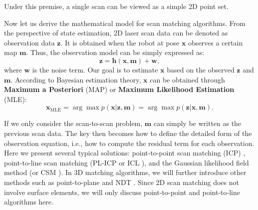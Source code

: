 Under this premise, a single scan can be viewed as a simple 2D point set.

Now let us derive the mathematical model for scan matching algorithms. From the perspective of state estimation, 2D laser scan data can be denoted as observation data $\bm{z}$. It is obtained when the robot at pose $\bm{x}$ observes a certain map $\bm{m}$. Thus, the observation model can be simply expressed as:
\begin{equation}\label{key}
	\bm{z} = \bm{h} (\bm{x}, \bm{m}) + \bm{w},
\end{equation}
where $\bm{w}$ is the noise term. Our goal is to estimate $\bm{x}$ based on the observed $\bm{z}$ and $\bm{m}$. According to Bayesian estimation theory, $\bm{x}$ can be obtained through \textbf{Maximum a Posteriori} (MAP) or \textbf{Maximum Likelihood Estimation} (MLE):
\begin{equation}\label{key}
	\bm{x}_{\mathrm{MLE}} = \arg \max p(\bm{x}|\bm{z}, \bm{m}) = \arg \max p(\bm{z}|\bm{x}, \bm{m}).
\end{equation}

If we only consider the scan-to-scan problem, $\bm{m}$ can simply be written as the previous scan data. The key then becomes how to define the detailed form of the observation equation, i.e., how to compute the residual term for each observation. Here we present several typical solutions: point-to-point scan matching (ICP) \cite{Arun1987}, point-to-line scan matching (PL-ICP \cite{Censi2008} or ICL \cite{Alshawa2007}), and the Gaussian likelihood field method (or CSM \cite{Olson2009}). In 3D matching algorithms, we will further introduce other methods such as point-to-plane \cite{Park2003,Low2004} and NDT \cite{Biber2003,Magnusson2009,Rapp2015}. Since 2D scan matching does not involve surface elements, we will only discuss point-to-point and point-to-line algorithms here.

